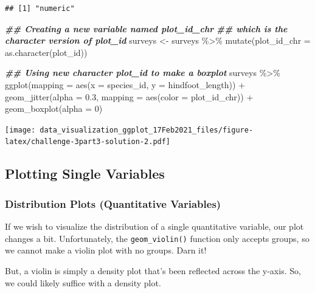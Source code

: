 \documentclass[
]{article}
\newenvironment{Shaded}{\begin{snugshade}}{\end{snugshade}}
\newcommand{\AttributeTok}[1]{\textcolor[rgb]{0.77,0.63,0.00}{#1}}
\newcommand{\DecValTok}[1]{\textcolor[rgb]{0.00,0.00,0.81}{#1}}
\newcommand{\DocumentationTok}[1]{\textcolor[rgb]{0.56,0.35,0.01}{\textbf{\textit{#1}}}}
\newcommand{\FloatTok}[1]{\textcolor[rgb]{0.00,0.00,0.81}{#1}}
\newcommand{\FunctionTok}[1]{\textcolor[rgb]{0.00,0.00,0.00}{#1}}
\newcommand{\NormalTok}[1]{#1}
\newcommand{\OtherTok}[1]{\textcolor[rgb]{0.56,0.35,0.01}{#1}}
\newcommand{\SpecialCharTok}[1]{\textcolor[rgb]{0.00,0.00,0.00}{#1}}
\begin{document}
\begin{verbatim}
## [1] "numeric"
\end{verbatim}

\begin{Shaded}
\begin{Highlighting}[]
\DocumentationTok{\#\# Creating a new variable named plot\_id\_chr}
\DocumentationTok{\#\# which is the character version of plot\_id}
\NormalTok{surveys }\OtherTok{\textless{}{-}}\NormalTok{ surveys }\SpecialCharTok{\%\textgreater{}\%} 
  \FunctionTok{mutate}\NormalTok{(}\AttributeTok{plot\_id\_chr =} \FunctionTok{as.character}\NormalTok{(plot\_id))}

\DocumentationTok{\#\# Using new character plot\_id to make a boxplot}
\NormalTok{surveys }\SpecialCharTok{\%\textgreater{}\%} 
  \FunctionTok{ggplot}\NormalTok{(}\AttributeTok{mapping =} \FunctionTok{aes}\NormalTok{(}\AttributeTok{x =}\NormalTok{ species\_id, }\AttributeTok{y =}\NormalTok{ hindfoot\_length)) }\SpecialCharTok{+}
  \FunctionTok{geom\_jitter}\NormalTok{(}\AttributeTok{alpha =} \FloatTok{0.3}\NormalTok{, }\AttributeTok{mapping =} \FunctionTok{aes}\NormalTok{(}\AttributeTok{color =}\NormalTok{ plot\_id\_chr)) }\SpecialCharTok{+}  
  \FunctionTok{geom\_boxplot}\NormalTok{(}\AttributeTok{alpha =} \DecValTok{0}\NormalTok{)  }
\end{Highlighting}
\end{Shaded}

\texttt{[image: data\_visualization\_ggplot\_17Feb2021\_files/figure-latex/challenge-3part3-solution-2.pdf]}

\hypertarget{plotting-single-variables}{%
\subsection{Plotting Single Variables}\label{plotting-single-variables}}

\hypertarget{distribution-plots-quantitative-variables}{%
\subsubsection{Distribution Plots (Quantitative
Variables)}\label{distribution-plots-quantitative-variables}}

If we wish to visualize the distribution of a single quantitative
variable, our plot changes a bit. Unfortunately, the
\texttt{geom\_violin()} function only accepts groups, so we cannot make
a violin plot with no groups. Darn it!

But, a violin is simply a density plot that's been reflected across the
y-axis. So, we could likely suffice with a density plot.
\end{document}
